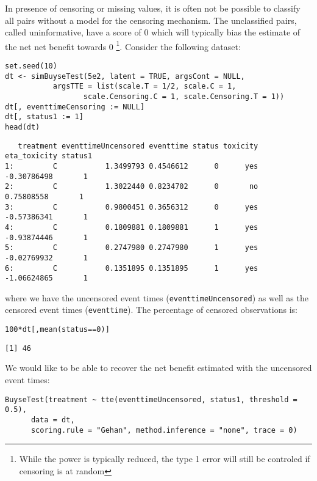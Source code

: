 \documentclass[12pt]{article}
\begin{document}
In presence of censoring or missing values, it is often not be
 possible to classify all pairs without a model for the censoring
 mechanism. The unclassified pairs, called uninformative, have a score
 of 0 which will typically bias the estimate of the net net benefit
 towards 0 \footnote{While the power is typically reduced, the type 1 error
 will still be controled if censoring is at random}. Consider the
 following dataset:
\lstset{language=r,label= ,caption= ,captionpos=b,numbers=none}
\begin{lstlisting}
set.seed(10)
dt <- simBuyseTest(5e2, latent = TRUE, argsCont = NULL,
		   argsTTE = list(scale.T = 1/2, scale.C = 1,
				  scale.Censoring.C = 1, scale.Censoring.T = 1))
dt[, eventtimeCensoring := NULL]
dt[, status1 := 1]
head(dt)
\end{lstlisting}

\begin{verbatim}
   treatment eventtimeUncensored eventtime status toxicity eta_toxicity status1
1:         C           1.3499793 0.4546612      0      yes  -0.30786498       1
2:         C           1.3022440 0.8234702      0       no   0.75808558       1
3:         C           0.9800451 0.3656312      0      yes  -0.57386341       1
4:         C           0.1809881 0.1809881      1      yes  -0.93874446       1
5:         C           0.2747980 0.2747980      1      yes  -0.02769932       1
6:         C           0.1351895 0.1351895      1      yes  -1.06624865       1
\end{verbatim}

where we have the uncensored event times (\texttt{eventtimeUncensored}) as well as the censored event
times (\texttt{eventtime}). The percentage of censored observations is:
\lstset{language=r,label= ,caption= ,captionpos=b,numbers=none}
\begin{lstlisting}
100*dt[,mean(status==0)]
\end{lstlisting}

\begin{verbatim}
[1] 46
\end{verbatim}

We would like to be able to recover the net benefit estimated with the uncensored event times:
\lstset{language=r,label= ,caption= ,captionpos=b,numbers=none}
\begin{lstlisting}
BuyseTest(treatment ~ tte(eventtimeUncensored, status1, threshold = 0.5),
	  data = dt,
	  scoring.rule = "Gehan", method.inference = "none", trace = 0)
\end{lstlisting}
\end{document}
